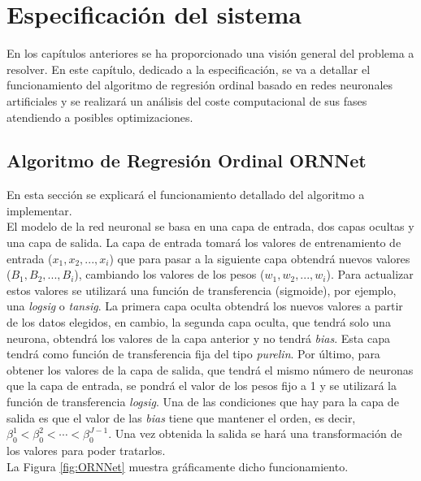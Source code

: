 \chapter{Especificación del sistema}
	
	En los capítulos anteriores se ha proporcionado una visión general del problema a resolver. En este capítulo, dedicado a la especificación, se va a detallar el funcionamiento del algoritmo de regresión ordinal basado en redes neuronales artificiales y se realizará un análisis del coste computacional de sus fases atendiendo a posibles optimizaciones.
	
	\section{Algoritmo de Regresión Ordinal ORNNet}
	
		En esta sección se explicará el funcionamiento detallado del algoritmo a implementar.\\
		
		El modelo de la red neuronal se basa en una capa de entrada, dos capas ocultas y una capa de salida. La capa de entrada tomará los valores de entrenamiento de entrada ($x_1, x_2, ..., x_i$) que para pasar a la siguiente capa obtendrá nuevos valores ($B_1, B_2, ..., B_i$), cambiando los valores de los pesos ($w_1, w_2, ..., w_i$). Para actualizar estos valores se utilizará una función de transferencia (sigmoide), por ejemplo, una \textit{logsig} o \textit{tansig}. La primera capa oculta obtendrá los nuevos valores a partir de los datos elegidos, en cambio, la segunda capa oculta, que tendrá solo una neurona, obtendrá los valores de la capa anterior y no tendrá \textit{bias}. Esta capa tendrá como función de transferencia fija del tipo \textit{purelin}. Por último, para obtener los valores de la capa de salida, que tendrá el mismo número de neuronas que la capa de entrada, se pondrá el valor de los pesos fijo a 1 y se utilizará la función de transferencia \textit{logsig}. Una de las condiciones que hay para la capa de salida es que el valor de las \textit{bias} tiene que mantener el orden, es decir, $\beta^1_0< \beta^2_0< \cdots < \beta^{J-1}_0$. Una vez obtenida la salida se hará una transformación de los valores para poder tratarlos.\\
		
		La Figura \ref{fig:ORNNet} muestra gráficamente dicho funcionamiento.\\
		
